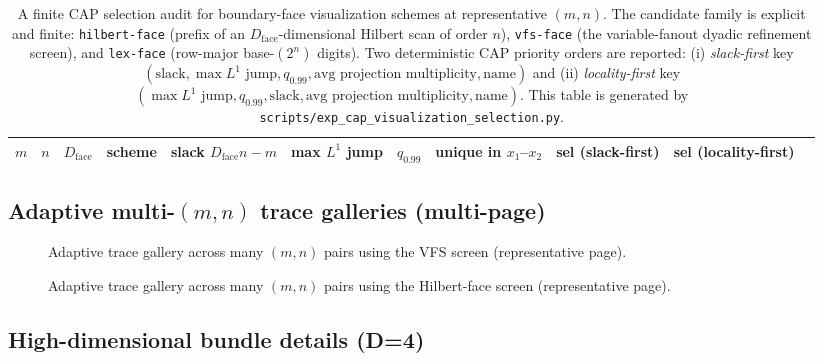 \begin{table}[H]
\centering
\scriptsize
\setlength{\tabcolsep}{6pt}
\renewcommand{\arraystretch}{1.15}
\begin{tabular}{rrr l r r r r l l l}
\toprule
$m$ & $n$ & $D_{\mathrm{face}}$ & scheme & slack $D_{\mathrm{face}}n-m$ & max $L^1$ jump & $q_{0.99}$ & unique in $x_1$--$x_2$ & sel (slack-first) & sel (locality-first) \\
\midrule
%
\end{tabular}
\caption{A finite CAP selection audit for boundary-face visualization schemes at representative $(m,n)$. The candidate family is explicit and finite: \texttt{hilbert-face} (prefix of an $D_{\mathrm{face}}$-dimensional Hilbert scan of order $n$), \texttt{vfs-face} (the variable-fanout dyadic refinement screen), and \texttt{lex-face} (row-major base-$(2^n)$ digits). Two deterministic CAP priority orders are reported: (i) \emph{slack-first} key $(\text{slack},\max L^1\text{ jump},q_{0.99},\text{avg projection multiplicity},\text{name})$ and (ii) \emph{locality-first} key $(\max L^1\text{ jump},q_{0.99},\text{slack},\text{avg projection multiplicity},\text{name})$. This table is generated by \texttt{scripts/exp\_cap\_visualization\_selection.py}.}
\label{tab:cap_visualization_selection}
\end{table}

\subsection{Adaptive multi-\texorpdfstring{$(m,n)$}{(m,n)} trace galleries (multi-page)}

\begin{figure}[H]
\centering
{}
\caption{Adaptive trace gallery across many $(m,n)$ pairs using the VFS screen (representative page).}
\label{fig:adaptive_vfs_trace_p01}
\end{figure}

\begin{figure}[H]
\centering
{}
\caption{Adaptive trace gallery across many $(m,n)$ pairs using the Hilbert-face screen (representative page).}
\label{fig:adaptive_hilbert_trace_p01}
\end{figure}

\subsection{High-dimensional bundle details (D=4)}
\label{subsec:bundle_detail_d4}

